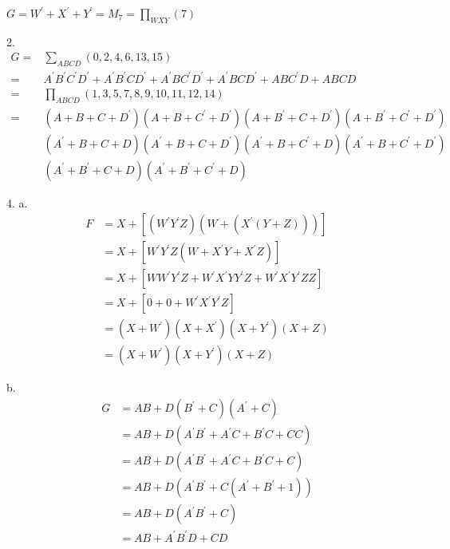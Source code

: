 \documentclass[UTF8,12pt,letterpaper,oneside]{amsart}
\begin{document}
$G = W^\prime + X^\prime + Y^\prime = M_7 = \prod_{WXY}(7)$

2.\begin{equation*}\begin{split}
G =& \sum_{ABCD}(0, 2, 4, 6, 13, 15)\\
  =& A^\prime B^\prime C^\prime D^\prime + A^\prime B^\prime C D^\prime + A^\prime B C^\prime D^\prime + A^\prime BC D^\prime + AB C^\prime D + ABCD\\
  =& \prod_{ABCD}(1, 3, 5, 7, 8, 9, 10, 11, 12, 14)\\
  =& (A + B + C + D^\prime)(A + B + C^\prime + D^\prime)(A + B^\prime + C+ D^\prime)(A + B^\prime + C^\prime + D^\prime)\\&(A^\prime + B + C + D)(A^\prime + B + C + D^\prime)(A^\prime + B + C^\prime + D)(A^\prime + B + C^\prime + D^\prime)\\&(A^\prime + B^\prime + C + D)(A^\prime + B^\prime + C^\prime + D)
\end{split}\end{equation*}

4. a. \begin{equation*}\begin{split}
F &= X + [(W^\prime Y^\prime Z)(W + (X^\prime(Y + Z)))]\\
  &= X + [W^\prime Y^\prime Z(W + X^\prime Y + X^\prime Z)]\\
  &= X + [WW^\prime Y^\prime Z + W^\prime X^\prime YY^\prime Z + W^\prime X^\prime Y^\prime ZZ]\\
  &= X + [0 + 0 + W^\prime X^\prime Y^\prime Z]\\
  &= (X + W^\prime)(X + X^\prime)(X + Y^\prime)(X + Z)\\
  &= (X + W^\prime)(X + Y^\prime)(X + Z)
\end{split}\end{equation*}

b. \begin{equation*}\begin{split}
G &= AB + D(B^\prime + C)(A^\prime + C)\\
  &= AB + D(A^\prime B^\prime  + A^\prime C + B^\prime C + CC)\\
  &= AB + D(A^\prime B^\prime  + A^\prime C + B^\prime C + C)\\
  &= AB + D(A^\prime B^\prime  + C(A^\prime + B^\prime + 1))\\
  &= AB + D(A^\prime B^\prime  + C)\\
  &= AB + A^\prime B^\prime D  + CD
\end{split}\end{equation*}
\end{document}
